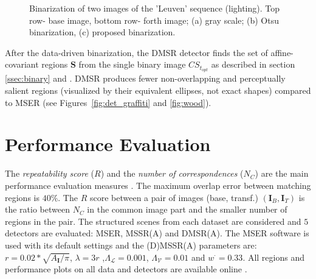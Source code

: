 \documentclass{article}
\def\I{{\mathbf I}}
\def\mcL{{\mathcal{L}}}
\def\mcV{{\mathcal{V}}}
\def\S{{\mathbf S}}
\begin{document}
\begin{figure}[htb]
 \vspace{-0.5cm}
\caption{Binarization of two images of the 'Leuven' sequence (lighting). Top row- base image, bottom row- forth image;   (a) gray scale; (b) Otsu binarization, (c) proposed binarization.}
\label{fig:leuven_bin}
%
\end{figure}

After the data-driven binarization, the DMSR detector finds the set of affine-covariant regions $\S$ from the single binary image $CS_{t_{opt}}$ as described in section \ref{ssec:binary} and \cite{RangMSSR06, RangHumpb06}. DMSR produces fewer non-overlapping and perceptually salient regions (visualized by their equivalent ellipses, not exact shapes) compared to MSER (see Figures~\ref{fig:det_graffiti} and \ref{fig:wood}).

\section{Performance  Evaluation}
\label{sec:perf}
The {\em repeatability score} ($R$) and the {\em number of correspondences} ($N_C$) are the main performance evaluation measures \cite{Mikolajczyk:2005}. The maximum overlap error between matching regions is $40\%$. The $R$ score between a pair of images (base, transf.) $(\I_B,\I_T)$ is the ratio between $N_C$ in the common image part and the smaller number of regions in the pair. The structured scenes from each dataset are considered and $5$ detectors are evaluated: MSER, MSSR(A) and DMSR(A). The MSER software is used with its default settings and the (D)MSSR(A) parameters are: $r = 0.02*\sqrt{A_{\I} / \pi}$, $\lambda=3r$ ,$\Lambda_{\mcL}=0.001$, $\Lambda_{\mcV}=0.01$ and  $w^{\cdot}=0.33$.  
All regions and performance plots on all data and detectors are available online \cite{Rang:html_res}.
\end{document}
